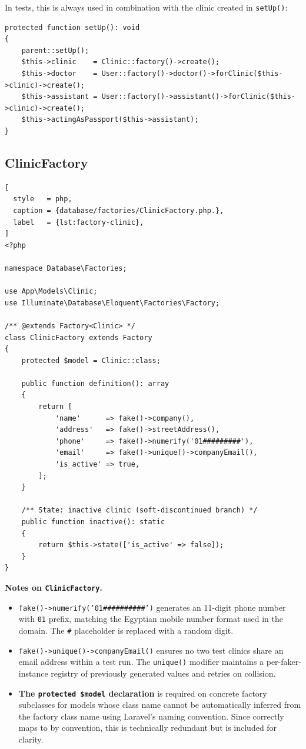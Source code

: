 In tests, this is always used in combination with the clinic created in
\texttt{setUp()}:

\begin{lstlisting}[style=php, caption={Typical setUp() fixture pattern.}, label={lst:setup-pattern}]
protected function setUp(): void
{
    parent::setUp();
    $this->clinic    = Clinic::factory()->create();
    $this->doctor    = User::factory()->doctor()->forClinic($this->clinic)->create();
    $this->assistant = User::factory()->assistant()->forClinic($this->clinic)->create();
    $this->actingAsPassport($this->assistant);
}
\end{lstlisting}

\subsection{ClinicFactory}

\begin{lstlisting}[
  style   = php,
  caption = {database/factories/ClinicFactory.php.},
  label   = {lst:factory-clinic},
]
<?php

namespace Database\Factories;

use App\Models\Clinic;
use Illuminate\Database\Eloquent\Factories\Factory;

/** @extends Factory<Clinic> */
class ClinicFactory extends Factory
{
    protected $model = Clinic::class;

    public function definition(): array
    {
        return [
            'name'      => fake()->company(),
            'address'   => fake()->streetAddress(),
            'phone'     => fake()->numerify('01#########'),
            'email'     => fake()->unique()->companyEmail(),
            'is_active' => true,
        ];
    }

    /** State: inactive clinic (soft-discontinued branch) */
    public function inactive(): static
    {
        return $this->state(['is_active' => false]);
    }
}
\end{lstlisting}

\textbf{Notes on \texttt{ClinicFactory}.}

\begin{itemize}
  \item \texttt{fake()->numerify('01\#\#\#\#\#\#\#\#\#\#')} generates
    an 11-digit phone number with \texttt{01} prefix, matching the
    Egyptian mobile number format used in the domain. The \texttt{\#}
    placeholder is replaced with a random digit.
  \item \texttt{fake()->unique()->companyEmail()} ensures no two
    test clinics share an email address within a test run. The
    \texttt{unique()} modifier maintains a per-faker-instance registry
    of previously generated values and retries on collision.
  \item \textbf{The \texttt{protected \$model} declaration} is required
    on concrete factory subclasses for models whose class name cannot
    be automatically inferred from the factory class name using
    Laravel's naming convention. Since 
    correctly maps to  by convention, this is
    technically redundant but is included for clarity.
\end{itemize}

